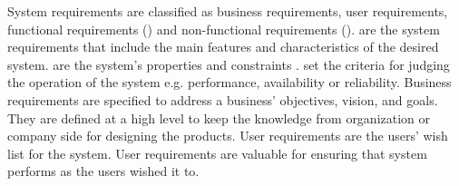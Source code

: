 System requirements are classified as business requirements, user
requirements, functional requirements (\FR) and non-functional requirements
(\NFR). \FR are the system requirements that include the
main features and characteristics of the desired system. \NFR are the
system's properties and constraints \cite{Davis:1993, Glinz}. \NFR set the
criteria for judging the operation of the system e.g.
performance, availability or reliability. Business requirements are specified to
address a business' objectives, vision, and goals. They are defined at a high
level to keep  the knowledge from organization
or company side for designing the products.
User requirements are the users' wish list for the system. User requirements are
valuable for ensuring that system performs as the users wished it to.
